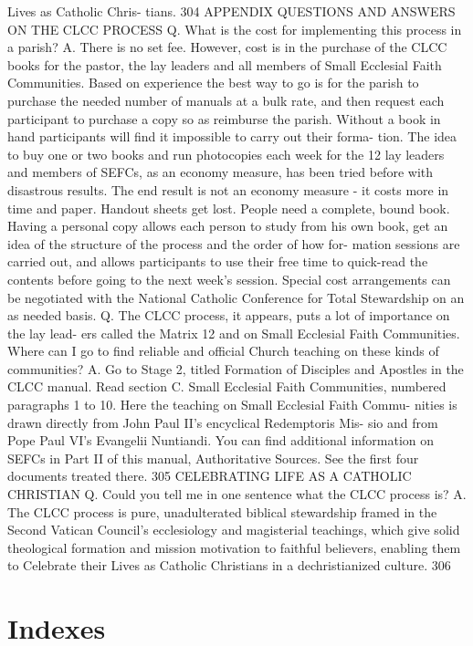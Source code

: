 \documentclass[oneside]{book}
\begin{document}
Lives as Catholic Chris- tians.  304 APPENDIX QUESTIONS AND ANSWERS ON THE CLCC
PROCESS Q. What is the cost for implementing this process in a parish?  A. There
is no set fee. However, cost is in the purchase of the CLCC books for the
pastor, the lay leaders and all members of Small Ecclesial Faith
Communities. Based on experience the best way to go is for the parish to
purchase the needed number of manuals at a bulk rate, and then request each
participant to purchase a copy so as reimburse the parish. Without a book in
hand participants will find it impossible to carry out their forma- tion. The
idea to buy one or two books and run photocopies each week for the 12 lay
leaders and members of SEFCs, as an economy measure, has been tried before with
disastrous results. The end result is not an economy measure - it costs more in
time and paper. Handout sheets get lost. People need a complete, bound book.
Having a personal copy allows each person to study from his own book, get an
idea of the structure of the process and the order of how for- mation sessions
are carried out, and allows participants to use their free time to quick-read
the contents before going to the next week's session. Special cost arrangements
can be negotiated with the National Catholic Conference for Total Stewardship on
an as needed basis.  Q. The CLCC process, it appears, puts a lot of importance
on the lay lead- ers called the Matrix 12 and on Small Ecclesial Faith
Communities. Where can I go to find reliable and official Church teaching on
these kinds of communities?  A. Go to Stage 2, titled Formation of Disciples and
Apostles in the CLCC manual. Read section C. Small Ecclesial Faith Communities,
numbered paragraphs 1 to 10. Here the teaching on Small Ecclesial Faith Commu-
nities is drawn directly from John Paul II's encyclical Redemptoris Mis- sio and
from Pope Paul VI's Evangelii Nuntiandi. You can find additional information on
SEFCs in Part II of this manual, Authoritative Sources. See the first four
documents treated there.  305 CELEBRATING LIFE AS A CATHOLIC CHRISTIAN Q. Could
you tell me in one sentence what the CLCC process is?  A. The CLCC process is
pure, unadulterated biblical stewardship framed in the Second Vatican Council's
ecclesiology and magisterial teachings, which give solid theological formation
and mission motivation to faithful believers, enabling them to Celebrate their
Lives as Catholic Christians in a dechristianized culture.  306

\part{Indexes}
\end{document}
